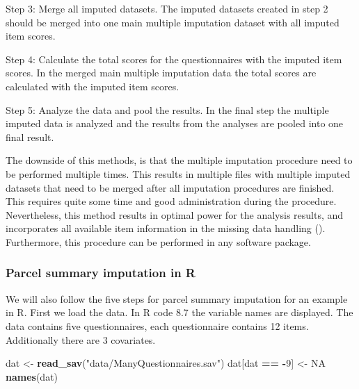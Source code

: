 \documentclass[]{book}
\newenvironment{Shaded}{\begin{snugshade}}{\end{snugshade}}
\newcommand{\KeywordTok}[1]{\textcolor[rgb]{0.13,0.29,0.53}{\textbf{#1}}}
\newcommand{\DecValTok}[1]{\textcolor[rgb]{0.00,0.00,0.81}{#1}}
\newcommand{\StringTok}[1]{\textcolor[rgb]{0.31,0.60,0.02}{#1}}
\newcommand{\OtherTok}[1]{\textcolor[rgb]{0.56,0.35,0.01}{#1}}
\newcommand{\OperatorTok}[1]{\textcolor[rgb]{0.81,0.36,0.00}{\textbf{#1}}}
\newcommand{\NormalTok}[1]{#1}
\begin{document}
Step 3: Merge all imputed datasets. The imputed datasets created in step
2 should be merged into one main multiple imputation dataset with all
imputed item scores.

Step 4: Calculate the total scores for the questionnaires with the
imputed item scores. In the merged main multiple imputation data the
total scores are calculated with the imputed item scores.

Step 5: Analyze the data and pool the results. In the final step the
multiple imputed data is analyzed and the results from the analyses are
pooled into one final result.

The downside of this methods, is that the multiple imputation procedure
need to be performed multiple times. This results in multiple files with
multiple imputed datasets that need to be merged after all imputation
procedures are finished. This requires quite some time and good
administration during the procedure. Nevertheless, this method results
in optimal power for the analysis results, and incorporates all
available item information in the missing data handling
(\citet{Eekhout2018}). Furthermore, this procedure can be performed in
any software package.

\subsubsection{Parcel summary imputation in
R}\label{parcel-summary-imputation-in-r}

We will also follow the five steps for parcel summary imputation for an
example in R. First we load the data. In R code 8.7 the variable names
are displayed. The data contains five questionnaires, each questionnaire
contains 12 items. Additionally there are 3 covariates.

\begin{Shaded}
\begin{Highlighting}[]
\NormalTok{dat <-}\StringTok{ }\KeywordTok{read_sav}\NormalTok{(}\StringTok{"data/ManyQuestionnaires.sav"}\NormalTok{)}
\NormalTok{dat[dat }\OperatorTok{==}\StringTok{ }\OperatorTok{-}\DecValTok{9}\NormalTok{] <-}\StringTok{ }\OtherTok{NA}
\KeywordTok{names}\NormalTok{(dat)}
\end{Highlighting}
\end{Shaded}
\end{document}
